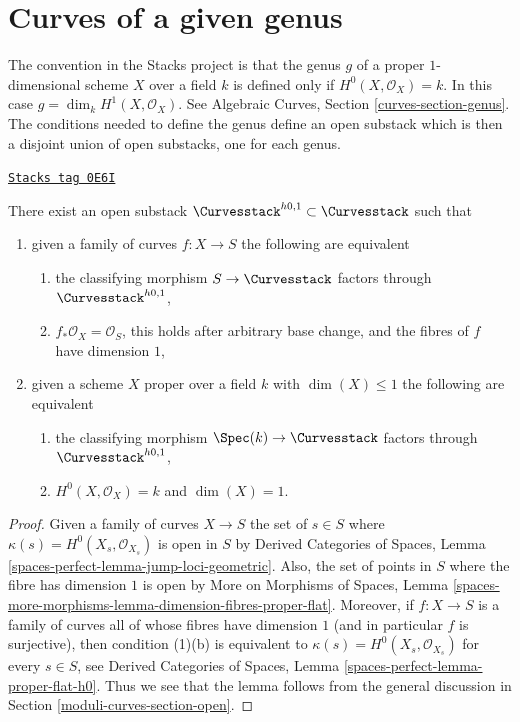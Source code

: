 \section{Curves of a given genus}
\label{moduli-curves-section-genus}
The convention in the Stacks project is that the genus $g$ of a
proper $1$-dimensional scheme $X$ over a field $k$ is defined only
if $H^0(X, \mathcal{O}_X) = k$. In this case
$g = \dim_k H^1(X, \mathcal{O}_X)$.
See Algebraic Curves, Section \ref{curves-section-genus}.
The conditions needed to define the genus define an open substack
which is then a disjoint union of open substacks, one for each genus.

\begin{lemma}
\label{moduli-curves-lemma-pre-genus-curves}
\href{https://stacks.math.columbia.edu/tag/0E6I}{\texttt{Stacks tag 0E6I}}

There exist an open substack $\Curvesstack^{h0, 1} \subset \Curvesstack$
such that
\begin{enumerate}
\item given a family of curves $f : X \to S$ the following are equivalent
\begin{enumerate}
\item the classifying morphism $S \to \Curvesstack$ factors
through $\Curvesstack^{h0, 1}$,
\item $f_*\mathcal{O}_X = \mathcal{O}_S$, this holds
after arbitrary base change, and the fibres of $f$ have dimension $1$,
\end{enumerate}
\item given a scheme $X$ proper over a field $k$ with $\dim(X) \leq 1$
the following are equivalent
\begin{enumerate}
\item the classifying morphism $\Spec(k) \to \Curvesstack$ factors
through $\Curvesstack^{h0, 1}$,
\item $H^0(X, \mathcal{O}_X) = k$ and $\dim(X) = 1$.
\end{enumerate}
\end{enumerate}
\end{lemma}

\begin{proof}
Given a family of curves $X \to S$ the set of $s \in S$ where
$\kappa(s) = H^0(X_s, \mathcal{O}_{X_s})$
is open in $S$ by Derived Categories of Spaces, Lemma
\ref{spaces-perfect-lemma-jump-loci-geometric}.
Also, the set of points in $S$ where the fibre has
dimension $1$ is open by More on Morphisms of Spaces, Lemma
\ref{spaces-more-morphisms-lemma-dimension-fibres-proper-flat}.
Moreover, if $f : X \to S$ is a family of curves all of whose fibres
have dimension $1$ (and in particular $f$ is surjective), then
condition (1)(b) is equivalent to
$\kappa(s) = H^0(X_s, \mathcal{O}_{X_s})$ for every $s \in S$, see
Derived Categories of Spaces, Lemma \ref{spaces-perfect-lemma-proper-flat-h0}.
Thus we see that the lemma follows from the general discussion in
Section \ref{moduli-curves-section-open}.
\end{proof}

